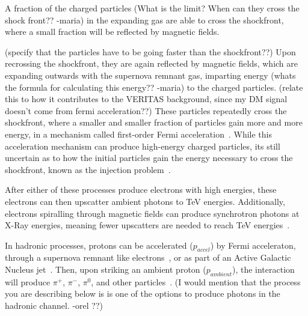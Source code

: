   \FloatBarrier


  {\color{red}A fraction of the charged particles (What is the limit? When can they cross the shock front?? -maria)} in the expanding gas are able to cross the shockfront, where a small fraction will be reflected by magnetic fields.
  
  
  
  
  {\color{red}(specify that the particles have to be going faster than the shockfront??)}
  Upon recrossing the shockfront, they are again reflected by magnetic fields, which are expanding outwards with the supernova remnant gas, {\color{red}imparting energy (whats the formula for calculating this energy?? -maria)} to the charged particles.
  {\color{red}(relate this to how it contributes to the VERITAS background, since my DM signal doesn't come from fermi acceleration??)}
  These particles repeatedly cross the shockfront, where a smaller and smaller fraction of particles gain more and more energy, in a mechanism called first-order Fermi acceleration~\cite{fermi1949,highenergyelectron_snr}.
  While this acceleration mechanism can produce high-energy charged particles, its still uncertain as to how the initial particles gain the energy necessary to cross the shockfront, known as the injection problem~\cite{inject2001}.
  
  After either of these processes produce electrons with high energies, these electrons can then upscatter ambient photons to TeV energies.
  Additionally, electrons spiralling through magnetic fields can produce synchrotron photons at X-Ray energies, meaning fewer upscatters are needed to reach TeV energies~\cite{self_compton}.

  In hadronic processes, protons can be accelerated ($p_{accel}$) by Fermi acceleraton, through a supernova remnant like electrons~\cite{proton_snr_accel}, or as part of an Active Galactic Nucleus jet~\cite{hadronic1,hadronic2}.
  Then, upon striking an ambient proton ($p_{ambient}$), the interaction will produce $\pi^{+}$, $\pi^{-}$, $\pi^{0}$, and other particles~\cite{pp_pion,pp_pion2}.
  {\color{red}(I would mention that the process you are describing below is is one of the options to produce photons in the hadronic channel. -orel ??)}
  
